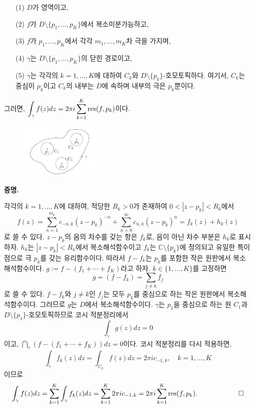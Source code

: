 \begin{salttheorem} [유수정리] {}{} \label{thm-4-11}

\begin{itemize}
\item[(1)] $D$가 영역이고,
\item[(2)] $f$가 $D\setminus \{p_1, \ldots, p_K\}$에서 복소미분가능하고,
\item[(3)] $f$가 $p_1, \ldots, p_K$에서 각각 $m_1, \ldots, m_K$차 극을 가지며,
\item[(4)] $\gamma$는 $D\setminus \{p_1, \ldots, p_K\}$의 닫힌 경로이고,
\item[(5)] $\gamma$는 각각의 $k=1,\ldots, K$에 대하여
$C_k$와 $D\setminus\{p_k\}$-호모토픽하다.
여기서, $C_k$는 중심이 $p_k$이고 $C_k$의 내부는 $D$에 속하며 
내부의 극은 $p_k$뿐이다.
\end{itemize}
그러면, $\displaystyle\int_\gamma f(z)dz = 2\pi i \sum\limits_{k=1}^K \mathop{\mathrm{res}}(f,p_k)$이다.
\end{salttheorem}

\begin{figure}[h!]
\begin{center}
\includegraphics[width=0.35\textwidth]{./SaltChapter/figs/fig-4-0-10}
\end{center}
\end{figure}

{\bf 증명.}

각각의 $k=1,\ldots, K$에 대하여,
적당한 $R_k>0$가 존재하여 $0<|z-p_k|<R_k$에서
\[
f(z) = \sum_{n=1}^{m_k} c_{-n,k} (z-p_k)^{-n}
+ \sum_{n=0}^\infty c_{n,k} (z-p_k)^n = f_k(z) + h_k(z)
\]
로 쓸 수 있다. $z-p_k$의 음의 차수를 갖는 항은 $f_k$로, 
음이 아닌 차수 부분은 $h_k$로 표시하자.
$h_k$는 $|z-p_k|<R_k$에서 복소해석함수이고
$f_k$는 $\mathbb C\setminus\{p_k\}$에 정의되고
유일한 특이점으로 극 $p_k$를 갖는 유리함수이다.
따라서 $f-f_k$는 $p_k$를 포함한 작은 원판에서 복소해석함수이다.
$g:= f - (f_1+\cdots + f_K)$라고 하자.
$k\in \{1,\ldots, K\}$를 고정하면
\[
g = (f-f_k) = \sum_{j\ne k} f_j
\]
로 쓸 수 있다.
$f-f_k$와 $j\ne k$인 $f_j$는 모두 $p_k$를 중심으로 하는 작은 원판에서
복소해석함수이다. 그러므로 $g$는 $D$에서 복소해석함수이다.
$\gamma$는  $p_1$을 중심으로 하는 원 $C_1$과 $D\setminus\{p_1\}$-호모토픽하므로
코시 적분정리에서
\[
\int_\gamma g(z)dz  = 0
\]
이고, $\dint_\gamma \left( f - (f_1+\cdots + f_K) \right) dz = 0$이다.
코시 적분정리를 다시 적용하면,
\[
\int_\gamma f_k(z)dz = \int_{C_k} f(z)dz = 2\pi i c_{-1,k},
\quad k=1,\ldots, K
\]
이므로
\[
\int_\gamma f(z)dz  = \sum_{k=1}^K \int_\gamma f_k(z)dz
= \sum_{k=1}^K 2\pi i c_{-1,k} = 2\pi i \sum_{k=1}^K \mathop{\mathrm{res}}(f,p_k).
\qquad\qquad\qquad\square
\]

